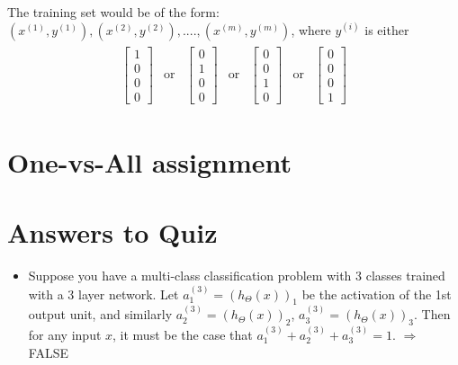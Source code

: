 \documentclass[a4paper,12pt]{report}
\begin{document}
The training set would be of the form: $(x^{(1)},y^{(1)}), (x^{(2)},y^{(2)}), ...., (x^{(m)},y^{(m)}) $, where $y^{(i)}$ is either 
\begin{align*}
\begin{array}{lllllll}
\left[\begin{smallmatrix} 1\\0\\0\\0 \end{smallmatrix} \right] & \mathrm{or} & \left[\begin{smallmatrix} 0\\1\\0\\0 \end{smallmatrix} \right] & \mathrm{or} & \left[\begin{smallmatrix} 0\\0\\1\\0 \end{smallmatrix} \right] & \mathrm{or} & \left[\begin{smallmatrix} 0\\0\\0\\1 \end{smallmatrix} \right]
\end{array}
\end{align*}

\begin{appendices}
\section{One-vs-All assignment}

\section{Answers to Quiz}
\begin{itemize}
\item Suppose you have a multi-class classification problem with 3 classes trained with a 3 layer network. Let $a_1 ^{(3)} = (h_{\Theta}(x))_1$ be the activation of the 1st output unit, and similarly  $a_2 ^{(3)} = (h_{\Theta}(x))_2$, $a_3 ^{(3)} = (h_{\Theta}(x))_3$. Then for any input $x$, it must be the case that $a_1 ^{(3)} + a_2 ^{(3)} + a_3 ^{(3)} = 1$. $\Rightarrow$ FALSE

\end{itemize}
\end{appendices}
\end{document}

